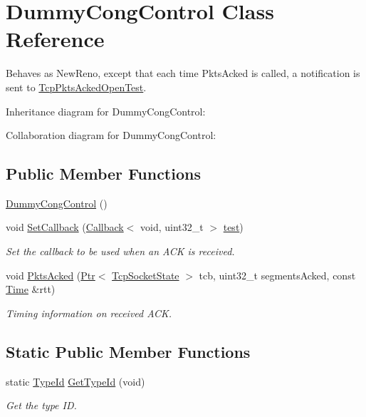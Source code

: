 \hypertarget{classDummyCongControl}{}\section{Dummy\+Cong\+Control Class Reference}
\label{classDummyCongControl}


Behaves as New\+Reno, except that each time Pkts\+Acked is called, a notification is sent to \hyperlink{classTcpPktsAckedOpenTest}{Tcp\+Pkts\+Acked\+Open\+Test}.  




Inheritance diagram for Dummy\+Cong\+Control\+:


Collaboration diagram for Dummy\+Cong\+Control\+:
\subsection*{Public Member Functions}
\begin{DoxyCompactItemize}
\item 
\hyperlink{classDummyCongControl_a6747d545084de1934b5864db13aa0557}{Dummy\+Cong\+Control} ()
\item 
void \hyperlink{classDummyCongControl_a8d64b26513447ac58711ff9a5ccf1c52}{Set\+Callback} (\hyperlink{classns3_1_1Callback}{Callback}$<$ void, uint32\+\_\+t $>$ \hyperlink{main-test-sync_8cc_a708a4c1a4d0c4acc4c447310dd4db27f}{test})
\begin{DoxyCompactList}\small\item\em Set the callback to be used when an A\+CK is received. \end{DoxyCompactList}\item 
void \hyperlink{classDummyCongControl_a13a0fafdaf34d3f77e69d747e4469acc}{Pkts\+Acked} (\hyperlink{classns3_1_1Ptr}{Ptr}$<$ \hyperlink{classns3_1_1TcpSocketState}{Tcp\+Socket\+State} $>$ tcb, uint32\+\_\+t segments\+Acked, const \hyperlink{classns3_1_1Time}{Time} \&rtt)
\begin{DoxyCompactList}\small\item\em Timing information on received A\+CK. \end{DoxyCompactList}\end{DoxyCompactItemize}
\subsection*{Static Public Member Functions}
\begin{DoxyCompactItemize}
\item 
static \hyperlink{classns3_1_1TypeId}{Type\+Id} \hyperlink{classDummyCongControl_af5f75299b166c38f0ad990ee974bcf47}{Get\+Type\+Id} (void)
\begin{DoxyCompactList}\small\item\em Get the type ID. \end{DoxyCompactList}\end{DoxyCompactItemize}
